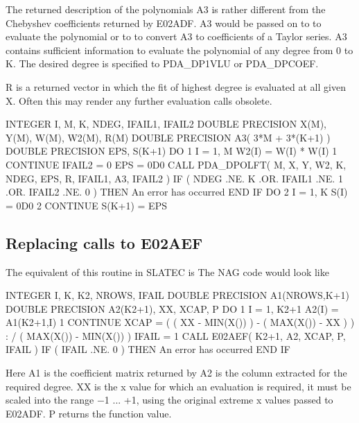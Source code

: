 \documentclass[11pt,twoside,nolof]{starlink}
\begin{document}
   The returned description of the polynomials A3 is rather different
   from the Chebyshev coefficients returned by E02ADF. A3 would be
   passed on to
   to evaluate the polynomial or to
   to
   convert A3 to coefficients of a Taylor series. A3 contains sufficient
   information to evaluate the polynomial of any degree from 0 to K. The
   desired degree is specified to PDA\_DP1VLU or PDA\_DPCOEF.

   R is a returned vector in which the fit of highest degree is
   evaluated at all given X. Often this may render any further
   evaluation calls obsolete.

\begin{terminalv}
      INTEGER I, M, K, NDEG, IFAIL1, IFAIL2
      DOUBLE PRECISION X(M), Y(M), W(M), W2(M), R(M)
      DOUBLE PRECISION A3( 3*M + 3*(K+1) )
      DOUBLE PRECISION EPS, S(K+1)
      DO 1 I = 1, M
         W2(I) = W(I) * W(I)
    1 CONTINUE
      IFAIL2 = 0
      EPS = 0D0
      CALL PDA_DPOLFT( M, X, Y, W2, K, NDEG, EPS, R, IFAIL1, A3, IFAIL2 )
      IF ( NDEG .NE. K .OR. IFAIL1 .NE. 1 .OR. IFAIL2 .NE. 0 ) THEN
         An error has occurred
      END IF
      DO 2 I = 1, K
         S(I) = 0D0
    2 CONTINUE
      S(K+1) = EPS
\end{terminalv}


\subsection{\label{m_e02aef}Replacing calls to E02AEF}

   The equivalent of this routine in SLATEC is
   The NAG code
   would look like

\begin{terminalv}
      INTEGER I, K, K2, NROWS, IFAIL
      DOUBLE PRECISION A1(NROWS,K+1)
      DOUBLE PRECISION A2(K2+1), XX, XCAP, P
      DO 1 I = 1, K2+1
         A2(I) = A1(K2+1,I)
    1 CONTINUE
      XCAP = ( ( XX - MIN(X()) ) - ( MAX(X()) - XX ) )
     :     / ( MAX(X()) - MIN(X()) )
      IFAIL = 1
      CALL E02AEF( K2+1, A2, XCAP, P, IFAIL )
      IF ( IFAIL .NE. 0 ) THEN
         An error has occurred
      END IF
\end{terminalv}

   Here A1 is the coefficient matrix returned by
   A2 is the
   column extracted for the required degree. XX is the x value for
   which an evaluation is required, it must be scaled into the range
   $-$1 ... +1, using the original extreme x values passed to E02ADF. P
   returns the function value.
\end{document}
